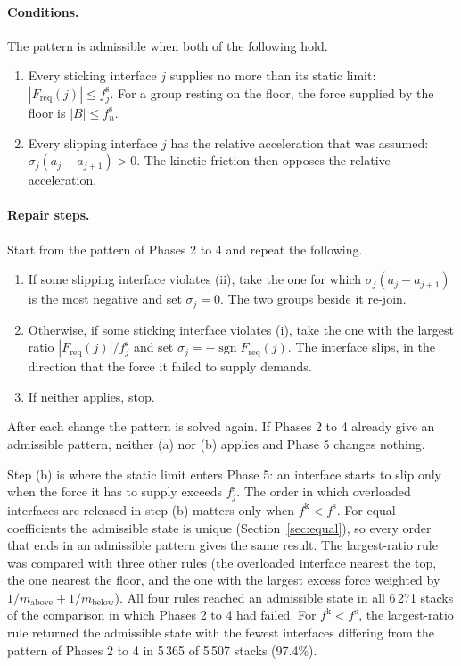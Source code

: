 \documentclass[11pt,a4paper]{article}
\newcommand{\fs}{f^{\mathrm{s}}}
\newcommand{\fkin}{f^{\mathrm{k}}}
\DeclareMathOperator{\sgn}{sgn}
\newcommand{\Freq}{F_{\mathrm{req}}}
\begin{document}
\paragraph{Conditions.} The pattern is admissible when both of the following hold.
\begin{enumerate}[label=(\roman*)]
\item Every sticking interface $j$ supplies no more than its static limit: $|\Freq(j)|\le \fs_j$. For a group resting on the floor, the force supplied by the floor is $|B|\le \fs_n$.
\item Every slipping interface $j$ has the relative acceleration that was assumed: $\sigma_j(a_j-a_{j+1})>0$. The kinetic friction then opposes the relative acceleration.
\end{enumerate}

\paragraph{Repair steps.} Start from the pattern of Phases 2 to 4 and repeat the following.
\begin{enumerate}[label=(\alph*)]
\item If some slipping interface violates (ii), take the one for which $\sigma_j(a_j-a_{j+1})$ is the most negative and set $\sigma_j=0$. The two groups beside it re-join.
\item Otherwise, if some sticking interface violates (i), take the one with the largest ratio $|\Freq(j)|/\fs_j$ and set $\sigma_j=-\sgn\Freq(j)$. The interface slips, in the direction that the force it failed to supply demands.
\item If neither applies, stop.
\end{enumerate}
After each change the pattern is solved again. If Phases 2 to 4 already give an admissible pattern, neither (a) nor (b) applies and Phase 5 changes nothing.

Step (b) is where the static limit enters Phase 5: an interface starts to slip only when the force it has to supply exceeds $\fs_j$. The order in which overloaded interfaces are released in step (b) matters only when $\fkin<\fs$. For equal coefficients the admissible state is unique (Section~\ref{sec:equal}), so every order that ends in an admissible pattern gives the same result. The largest-ratio rule was compared with three other rules (the overloaded interface nearest the top, the one nearest the floor, and the one with the largest excess force weighted by $1/m_{\text{above}}+1/m_{\text{below}}$). All four rules reached an admissible state in all 6\,271 stacks of the comparison in which Phases 2 to 4 had failed. For $\fkin<\fs$, the largest-ratio rule returned the admissible state with the fewest interfaces differing from the pattern of Phases 2 to 4 in 5\,365 of 5\,507 stacks (97.4\%).
\end{document}

